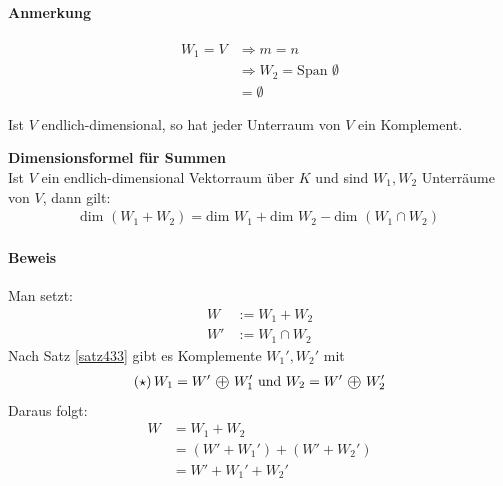 \documentclass[11pt]{report}
\newcommand*\directsum{%
\text{ \textcircled{+} }
}
\newcommand*\f[1] {\textbf{#1}}
\begin{document}
\paragraph{Anmerkung}
\begin{align}
 W_1 = V &\Rightarrow m=n \\
&\Rightarrow W_2 = \text{Span }\emptyset\\
&= \emptyset
\end{align}

\begin{satz}
\label{satz433}
Ist $V$ endlich-dimensional, so hat jeder Unterraum von $V$ ein Komplement.
\end{satz}
\newpage
\begin{satz} \f{Dimensionsformel für Summen} {\ \\}
\label{satz434}
Ist $V$ ein endlich-dimensional Vektorraum über $K$ und sind $W_1, W_2$ Unterräume von $V$, dann gilt:
\begin{align}
 \text{dim }(W_1 + W_2) = \text{dim } W_1 + \text{dim } W_2 - \text{dim } (W_1 \cap W_2)
\end{align}
\end{satz}

\paragraph{Beweis}
Man setzt:
\begin{align}
 W &:= W_1 + W_2 \\
 W' &:= W_1 \cap W_2
\end{align}
Nach Satz \ref{satz433} gibt es Komplemente $W_1', W_2'$ mit
\begin{align}
 (\star) \, W_1 = W' \directsum W_1' \text{ und } W_2 = W' \directsum W_2' 
\end{align}
Daraus folgt:
\begin{align}
 W &= W_1 + W_2 \\
 &= (W'+W_1') + (W' + W_2') \\
 &= W' + W_1' + W_2'
\end{align}
\end{document}
